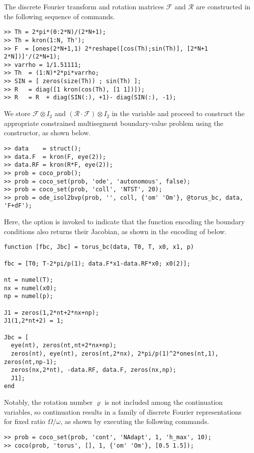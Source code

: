 The discrete Fourier transform and rotation matrices $\mathcal{F}$ and $\mathcal{R}$ are constructed in the following sequence of commands.
\begin{lstlisting}[language=coco-highlight]
>> Th = 2*pi*(0:2*N)/(2*N+1);
>> Th = kron(1:N, Th');
>> F  = [ones(2*N+1,1) 2*reshape([cos(Th);sin(Th)], [2*N+1 2*N])]'/(2*N+1);
>> varrho = 1/1.51111;
>> Th  = (1:N)*2*pi*varrho;
>> SIN = [ zeros(size(Th)) ; sin(Th) ];
>> R   = diag([1 kron(cos(Th), [1 1])]);
>> R   = R  + diag(SIN(:), +1)- diag(SIN(:), -1);
\end{lstlisting}
We store $\mathcal{F}\otimes I_2$ and $\left(\mathcal{R}\cdot\mathcal{F}\right)\otimes I_2$ in the variable  and proceed to construct the appropriate constrained multisegment boundary-value problem using the  constructor, as shown below.
\begin{lstlisting}[language=coco-highlight]
>> data    = struct();
>> data.F  = kron(F, eye(2));
>> data.RF = kron(R*F, eye(2));
>> prob = coco_prob();
>> prob = coco_set(prob, 'ode', 'autonomous', false);
>> prob = coco_set(prob, 'coll', 'NTST', 20);
>> prob = ode_isol2bvp(prob, '', coll, {'om' 'Om'}, @torus_bc, data, 'F+dF');
\end{lstlisting}
Here, the  option is invoked to indicate that the function encoding the boundary conditions also returns their Jacobian, as shown in the encoding of  below.
\begin{lstlisting}[language=coco-highlight]
function [fbc, Jbc] = torus_bc(data, T0, T, x0, x1, p)

fbc = [T0; T-2*pi/p(1); data.F*x1-data.RF*x0; x0(2)];

nt = numel(T);
nx = numel(x0);
np = numel(p);

J1 = zeros(1,2*nt+2*nx+np);
J1(1,2*nt+2) = 1;

Jbc = [
  eye(nt), zeros(nt,nt+2*nx+np);
  zeros(nt), eye(nt), zeros(nt,2*nx), 2*pi/p(1)^2*ones(nt,1), zeros(nt,np-1);
  zeros(nx,2*nt), -data.RF, data.F, zeros(nx,np);
  J1];
end
\end{lstlisting}
Notably, the rotation number $\varrho$ is not included among the continuation variables, so continuation results in a family of discrete Fourier representations for fixed ratio $\Omega/\omega$, as shown by executing the following commands.
\begin{lstlisting}[language=coco-highlight]
>> prob = coco_set(prob, 'cont', 'NAdapt', 1, 'h_max', 10);
>> coco(prob, 'torus', [], 1, {'om' 'Om'}, [0.5 1.5]);
\end{lstlisting}
